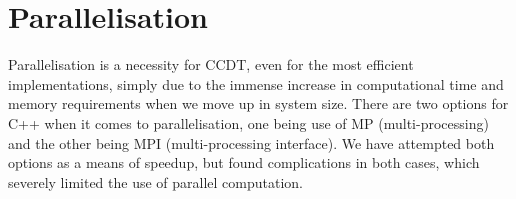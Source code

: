 	\section{Parallelisation}
	Parallelisation is a necessity for CCDT, even for the most efficient implementations, simply due to the immense increase in computational time and memory requirements when we move up in system size. There are two options for C++ when it comes to parallelisation, one being use of MP (multi-processing) and the other being MPI (multi-processing interface). We have attempted both options as a means of speedup, but found complications in both cases, which severely limited the use of parallel computation.\\
	
